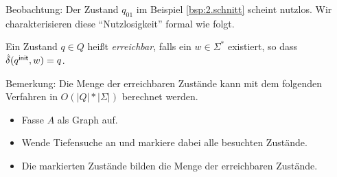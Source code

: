 % 
% 

Beobachtung: Der Zustand $q_{01}$ im Beispiel \ref{bsp:2.schnitt} scheint nutzlos. Wir charakterisieren diese ``Nutzlosigkeit'' formal wie folgt.

\begin{Def}
  Ein Zustand $q \in Q$ heißt \emph{erreichbar}, falls ein $w \in \Sigma^*$ existiert, so dass $\hat \delta({q^\mathsf{init}}, w) = q$.
\end{Def}
Bemerkung: Die Menge der erreichbaren Zustände kann mit dem folgenden Verfahren in $O(|Q|*|\Sigma|)$ berechnet werden.
  \begin{itemize}
  \item Fasse $A$ als Graph auf.
  \item Wende Tiefensuche an und markiere dabei alle besuchten Zustände.
  \item Die markierten Zustände bilden die Menge der erreichbaren Zustände.
  \end{itemize}



